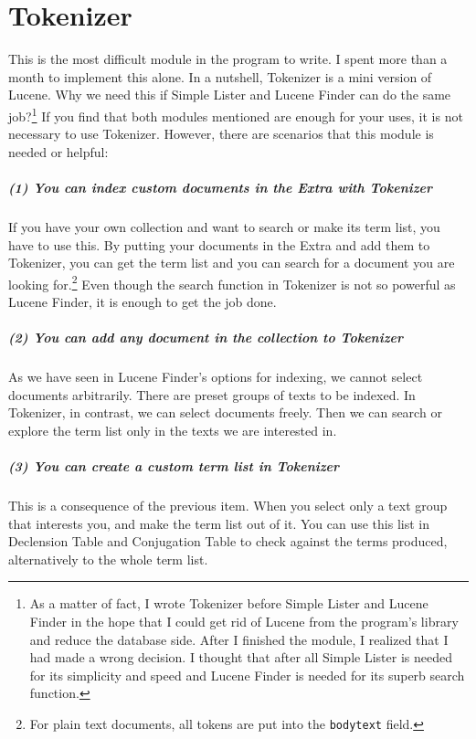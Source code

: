 \chapter{Tokenizer}\label{chap:tokenizer}

This is the most difficult module in the program to write. I spent more than a month to implement this alone. In a nutshell, Tokenizer is a mini version of Lucene. Why we need this if Simple Lister and Lucene Finder can do the same job?\footnote{As a matter of fact, I wrote Tokenizer before Simple Lister and Lucene Finder in the hope that I could get rid of Lucene from the program's library and reduce the database side. After I finished the module, I realized that I had made a wrong decision. I thought that after all Simple Lister is needed for its simplicity and speed and Lucene Finder is needed for its superb search function.} If you find that both modules mentioned are enough for your uses, it is not necessary to use Tokenizer. However, there are scenarios that this module is needed or helpful:

\paragraph{(1) You can index custom documents in the Extra with Tokenizer} If you have your own collection and want to search or make its term list, you have to use this. By putting your documents in the Extra and add them to Tokenizer, you can get the term list and you can search for a document you are looking for.\footnote{For plain text documents, all tokens are put into the \texttt{bodytext} field.} Even though the search function in Tokenizer is not so powerful as Lucene Finder, it is enough to get the job done.

\paragraph{(2) You can add any document in the collection to Tokenizer} As we have seen in Lucene Finder's options for indexing, we cannot select documents arbitrarily. There are preset groups of texts to be indexed. In Tokenizer, in contrast, we can select documents freely. Then we can search or explore the term list only in the texts we are interested in.

\paragraph{(3) You can create a custom term list in Tokenizer} This is a consequence of the previous item. When you select only a text group that interests you, and make the term list out of it. You can use this list in Declension Table and Conjugation Table to check against the terms produced, alternatively to the whole term list. 

